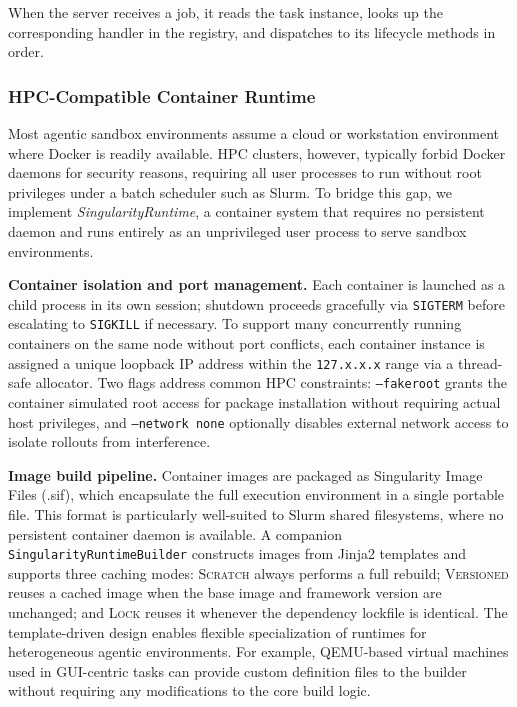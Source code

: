When the server receives a job, it reads the task instance, looks up the corresponding handler in the registry, and dispatches to its lifecycle methods in order.

\subsubsection{HPC-Compatible Container Runtime}
\label{sec:runtime}

Most agentic sandbox environments assume a cloud or workstation environment where Docker is readily available.
HPC clusters, however, typically forbid Docker daemons for security reasons, requiring all user processes to run without root privileges under a batch scheduler such as Slurm.
To bridge this gap, we implement \emph{SingularityRuntime}, a container system that requires no persistent daemon and runs entirely as an unprivileged user process to serve sandbox environments.  

\textbf{Container isolation and port management.} 
Each container is launched as a child process in its own session; shutdown proceeds gracefully via \texttt{SIGTERM} before escalating to \texttt{SIGKILL} if necessary.
To support many concurrently running containers on the same node without port conflicts, each container instance is assigned a unique loopback IP address within the \texttt{127.x.x.x} range via a thread-safe allocator.
Two flags address common HPC constraints: \texttt{--fakeroot} grants the container simulated root access for package installation without requiring actual host privileges, and \texttt{--network none} optionally disables external network access to isolate rollouts from interference.

\textbf{Image build pipeline.} 
Container images are packaged as Singularity Image Files (.sif), which encapsulate the full execution environment in a single portable file. This format is particularly well-suited to Slurm shared filesystems, where no persistent container daemon is available.
A companion \texttt{SingularityRuntimeBuilder} constructs images from Jinja2 templates and supports three caching modes: 
\textsc{Scratch} always performs a full rebuild; \textsc{Versioned} reuses a cached image when the base image and framework version are unchanged; and \textsc{Lock} reuses it whenever the dependency lockfile is identical.
The template-driven design enables flexible specialization of runtimes for heterogeneous agentic environments.
For example, QEMU-based virtual machines used in GUI-centric tasks can provide custom definition files to the builder without requiring any modifications to the core build logic.

